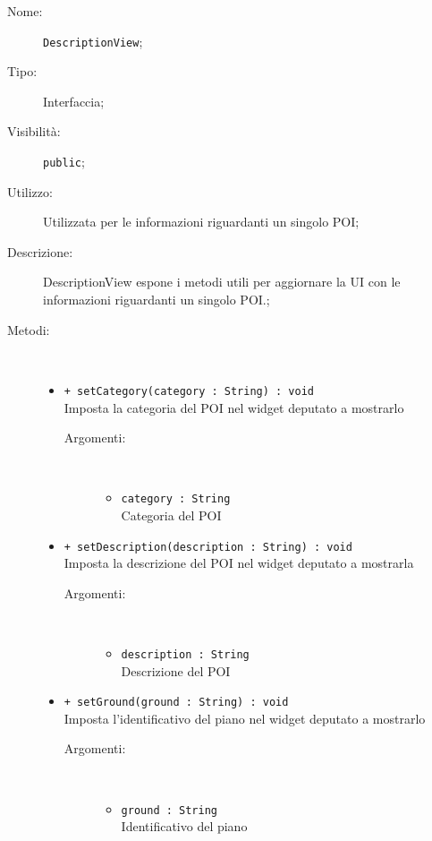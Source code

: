 \documentclass[../DefinizioneDiProdotto.tex]{subfiles}
\begin{document}
\begin{description}
	\item[Nome:] \texttt{DescriptionView};
	\item[Tipo:] Interfaccia;
	\item[Visibilità:] \texttt{public};
	\item[Utilizzo:] Utilizzata per le informazioni riguardanti un singolo POI;
	\item[Descrizione:] DescriptionView espone i metodi utili per aggiornare la UI con le informazioni riguardanti un singolo POI.;
	\item[Metodi:] \
	\begin{itemize}
		\item \texttt{+ setCategory(category : String) : void}\\
		Imposta la categoria del POI nel widget deputato a mostrarlo
		\begin{description}
			\item[Argomenti:] \
			\begin{itemize}
				\item \texttt{category : String}\\
				Categoria del POI\end{itemize}
		\end{description}
		\item \texttt{+ setDescription(description : String) : void}\\
		Imposta la descrizione del POI nel widget deputato a mostrarla
		\begin{description}
			\item[Argomenti:] \
			\begin{itemize}
				\item \texttt{description : String}\\
				Descrizione del POI\end{itemize}
		\end{description}
		\item \texttt{+ setGround(ground : String) : void}\\
		Imposta l'identificativo del piano nel widget deputato a mostrarlo
		\begin{description}
			\item[Argomenti:] \
			\begin{itemize}
				\item \texttt{ground : String}\\
				Identificativo del piano\end{itemize}
		\end{description}
	\end{itemize}
\end{description}
\end{document}
